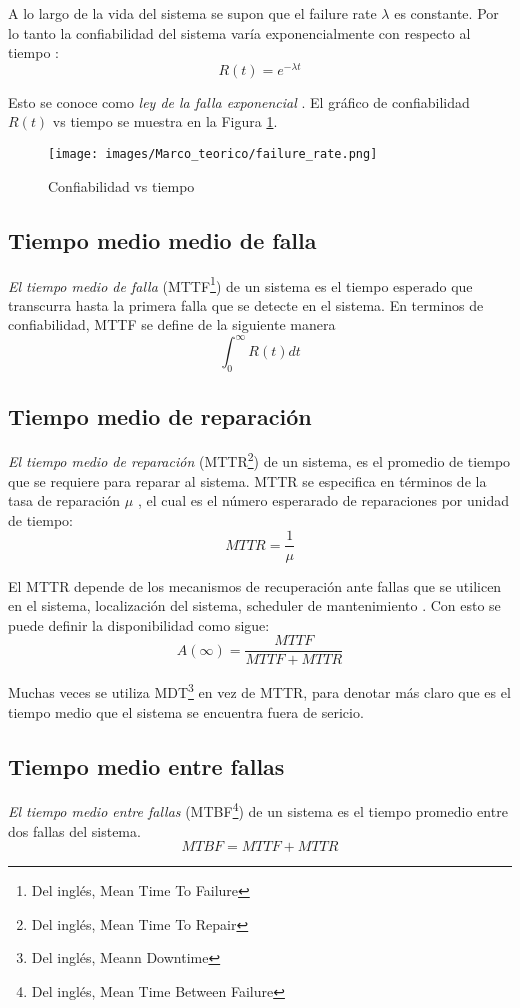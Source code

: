 A lo largo de la vida del sistema se supon que el failure rate $\lambda$ es constante. Por lo tanto la confiabilidad del sistema varía exponencialmente
con respecto al tiempo \citep{FTDesign}: $$R(t) = e^{- \lambda t}$$

Esto se conoce como \textit{ley de la falla exponencial} \citep{FTDesign}. El gráfico de confiabilidad $R(t)$ vs tiempo se muestra en la Figura \ref{fig:failure_rate}.

\begin{figure}[h]
 \centering
 \texttt{[image: images/Marco\_teorico/failure\_rate.png]}
  \caption{Confiabilidad vs tiempo }
\label{fig:failure_rate}
\end{figure}

\subsection{Tiempo medio medio de falla}
\textit{El tiempo medio de falla} (MTTF\footnote{Del inglés, Mean Time To Failure}) de un sistema es el tiempo esperado que transcurra hasta la primera falla que se
detecte en el sistema. En terminos de confiabilidad, MTTF se define de la siguiente manera \citep{FTDesign} \citep{Rausand04} $$\int_0^{\infty} R(t) dt$$

\subsection{Tiempo medio de reparación}
\textit{El tiempo medio de reparación} (MTTR\footnote{Del inglés, Mean Time To Repair})
de un sistema, es el promedio de tiempo que se requiere para reparar al sistema.
MTTR se especifica en términos de la tasa de reparación $\mu$ \citep{FTDesign} \citep{Rausand04}, el cual es el número esperarado de reparaciones por unidad de tiempo: $$MTTR = \frac{1}{\mu}$$

El MTTR depende de los mecanismos de recuperación ante fallas que se utilicen en el sistema, localización del sistema, scheduler de mantenimiento \citep{FTDesign}. Con esto se puede definir la disponibilidad como sigue: $$A(\infty) = \frac{MTTF}{MTTF+MTTR}$$

Muchas veces se utiliza MDT\footnote{Del inglés, Meann Downtime} en vez de MTTR, para denotar más claro que es el tiempo medio que el sistema se encuentra fuera de sericio.

\subsection{Tiempo medio entre fallas}
\textit{El tiempo medio entre fallas} (MTBF\footnote{Del inglés, Mean Time Between Failure}) de un sistema es el tiempo promedio entre dos fallas del sistema. $$MTBF = MTTF + MTTR$$


